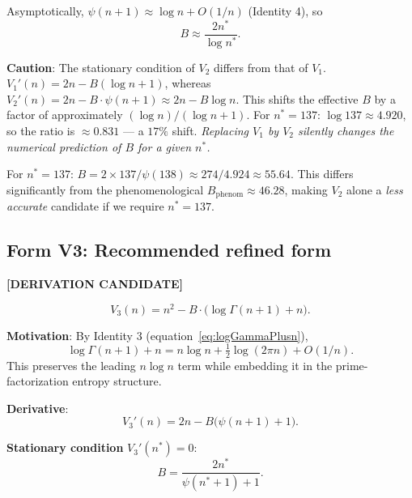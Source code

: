 \documentclass[12pt,a4paper]{article}
\theoremstyle{definition}
\theoremstyle{remark}
\newcommand{\DERIVCAND}{\textcolor{orange!80!black}{\textbf{[DERIVATION CANDIDATE]}}}
\begin{document}
Asymptotically, $\psi(n+1) \approx \log n + O(1/n)$ (Identity 4), so
\begin{equation}
  B \approx \frac{2n^*}{\log n^*}.
  \label{eq:V2_stat_asymp}
\end{equation}

\begin{warnbox}
\textbf{Caution}: The stationary condition of $V_2$ differs from that of $V_1$.
$V_1'(n) = 2n - B(\log n + 1)$, whereas $V_2'(n) = 2n - B\cdot\psi(n+1)
\approx 2n - B\log n$.  This shifts the effective $B$ by a factor of approximately
$(\log n)/(\log n + 1)$.  For $n^* = 137$: $\log 137 \approx 4.920$, so the ratio
is $\approx 0.831$ — a $17\%$ shift.  \emph{Replacing $V_1$ by $V_2$ silently
changes the numerical prediction of $B$ for a given $n^*$.}
\end{warnbox}

For $n^* = 137$: $B = 2\times137/\psi(138) \approx 274/4.924 \approx 55.64$.
This differs significantly from the phenomenological $B_{\mathrm{phenom}} \approx 46.28$,
making $V_2$ alone a \emph{less accurate} candidate if we require $n^* = 137$.

\subsection{Form V3: Recommended refined form}
\label{sec:V3}

\DERIVCAND{}

\begin{equation}
  V_3(n) = n^2 - B\cdot\bigl(\log\Gamma(n+1) + n\bigr).
  \label{eq:V3}
\end{equation}

\textbf{Motivation}: By Identity 3 (equation~\eqref{eq:logGammaPlusn}),
\begin{equation}
  \log\Gamma(n+1) + n = n\log n + \tfrac{1}{2}\log(2\pi n) + O(1/n).
\end{equation}
This preserves the leading $n\log n$ term while embedding it in the prime-factorization
entropy structure.

\textbf{Derivative}:
\begin{equation}
  V_3'(n) = 2n - B\bigl(\psi(n+1) + 1\bigr).
  \label{eq:V3_deriv}
\end{equation}

\textbf{Stationary condition} $V_3'(n^*) = 0$:
\begin{equation}
  B = \frac{2n^*}{\psi(n^*+1) + 1}.
  \label{eq:V3_stat}
\end{equation}
\end{document}
